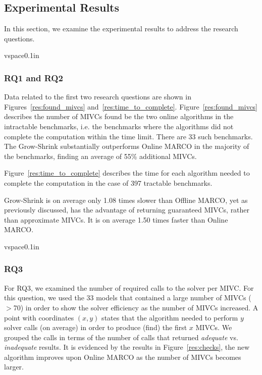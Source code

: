 


\subsection{Experimental Results}
In this section, we examine the experimental results to address the research questions.

vspace{0.1in}
\subsubsection{RQ1 and RQ2}
Data related to the first two research questions are shown in Figures~\ref{res:found_mivcs} and~\ref{res:time_to_complete}.
Figure~\ref{res:found_mivcs} describes the number of MIVCs found be the two online algorithms in the intractable benchmarks, i.e. the benchmarks where the algorithms did not complete the computation within the time limit. There are 33 such benchmarks. The Grow-Shrink substantially outperforms Online MARCO in the majority of the benchmarks, finding an average of 55\% additional MIVCs.

Figure~\ref{res:time_to_complete} describes the time for each algorithm needed to complete the computation in the case of 397 tractable benchmarks.

Grow-Shrink is on
average only 1.08 times slower than Offline MARCO,
yet as previously discussed,
has the advantage of returning guaranteed MIVCs,
rather than approximate MIVCs.
It is on average 1.50 times faster than Online MARCO.




vspace{0.1in}
\subsubsection{RQ3}  For RQ3, we examined the number of required calls to the solver per MIVC.  For this question, we used the 33 models that contained a large number of MIVCs ($>$70) in order to show the solver efficiency as the number of MIVCs increased.  A point with coordinates $(x,y)$ states that the algorithm needed to perform $y$ solver calls (on average) in order to produce (find) the first $x$ MIVCs. We grouped the calls in terms of the number of calls that returned {\em adequate} vs. {\em inadequate} results.  It is evidenced by the results in Figure~\ref{res:checks}, the new algorithm improves upon Online MARCO as the number of MIVCs becomes larger.

